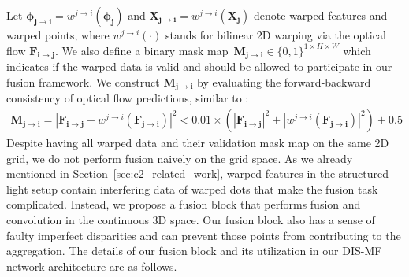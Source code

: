 Let $\boldsymbol{\phi_{j \rightarrow i}}=w^{j \rightarrow i}(\boldsymbol{\phi_j})$ and $\boldsymbol{X_{j \rightarrow i}}=w^{j \rightarrow i}(\boldsymbol{X_j})$ denote warped features and warped points, where $w^{j \rightarrow i}(\cdot)$ stands for bilinear 2D warping via the optical flow $\boldsymbol{F_{i \rightarrow j}}$. We also define a binary mask map~$\boldsymbol{M_{j \rightarrow i}} \in \{0,1\}^{1 \times H \times W}$ which indicates if the warped data is valid and should be allowed to participate in our fusion framework. We construct $\boldsymbol{M_{j \rightarrow i}}$ by evaluating the forward-backward consistency of optical flow predictions, similar to \cite{zou2018df,meister2017unflow}:
\begin{align}\label{eqn:flow_forward_backward}
    \boldsymbol{M_{j \rightarrow i}} = |\boldsymbol{F_{i \rightarrow j}} + w^{j \rightarrow i}(\boldsymbol{F_{j \rightarrow i}})|^2 < 0.01 \times (|\boldsymbol{F_{i \rightarrow j}}|^2 + |w^{j \rightarrow i}(\boldsymbol{F_{j \rightarrow i}})|^2) + 0.5
\end{align}
Despite having all warped data and their validation mask map on the same 2D grid, we do not perform fusion naively on the grid space. As we already mentioned in Section~\ref{sec:c2_related_work}, warped features in the structured-light setup contain interfering data of warped dots that make the fusion task complicated. Instead, we propose a fusion block that performs fusion and convolution in the continuous 3D space. Our fusion block also has a sense of faulty imperfect disparities and can prevent those points from contributing to the aggregation. The details of our fusion block and its utilization in our DIS-MF network architecture are as follows.

